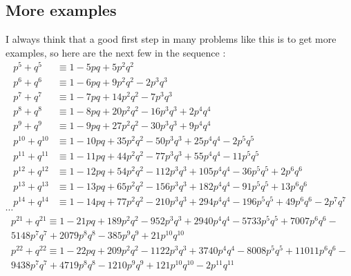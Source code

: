 \documentclass[a4paper,10pt]{article}
\begin{document}
\begin{flushleft}
\section{More examples} 
I always think that a good first step in many problems like this is to get more examples, so here are the next few in the sequence :  
\begin{align*}
p^5 + q^5  &\equiv 1 - 5pq + 5p^2q^2 \\
p^6 + q^6  &\equiv 1 - 6pq + 9p^2q^2 - 2p^3q^3 \\
p^7 + q^7  &\equiv 1 - 7pq + 14p^2q^2 - 7p^3q^3 \\
p^8 + q^8  &\equiv 1 - 8pq + 20p^2q^2 - 16p^3q^3 + 2p^4q^4 \\
p^9 + q^9  &\equiv 1 - 9pq + 27p^2q^2 - 30p^3q^3 + 9p^4q^4 \\
p^{10} + q^{10}  &\equiv 1 - 10pq + 35p^2q^2 - 50p^3q^3 + 25p^4q^4 - 2p^5q^5 \\
p^{11} + q^{11}  &\equiv 1 - 11pq + 44p^2q^2 - 77p^3q^3 + 55p^4q^4 - 11p^5q^5 \\
p^{12} + q^{12}  &\equiv 1 - 12pq + 54p^2q^2 - 112p^3q^3 + 105p^4q^4 - 36p^5q^5 + 2p^6q^6 \\
p^{13} + q^{13}  &\equiv 1 - 13pq + 65p^2q^2 - 156p^3q^3 + 182p^4q^4 - 91p^5q^5 + 13p^6q^6 \\
p^{14} + q^{14}  &\equiv 1 - 14pq + 77p^2q^2 - 210p^3q^3 + 294p^4q^4 - 196p^5q^5 + 49p^6q^6 - 2p^7q^7 
\end{align*}  $\cdots $
\begin{multline*}
p^{21} + q^{21}  \equiv 1 - 21pq + 189p^2q^2 - 952p^3q^3 + 2940p^4q^4 - 5733p^5q^5 + 7007p^6q^6 - \\ 
5148p^7q^7 + 2079p^8q^8 - 385p^9q^9 + 21p^{10}q^{10} \\
p^{22} + q^{22}  \equiv 1 - 22pq + 209p^2q^2 - 1122p^3q^3 + 3740p^4q^4 - 8008p^5q^5 + 11011p^6q^6 - \\ 
9438p^7q^7 + 4719p^8q^8 - 1210p^9q^9 + 121p^{10}q^{10} - 2p^{11}q^{11} \\
\end{multline*}
\end{flushleft}
\end{document}
